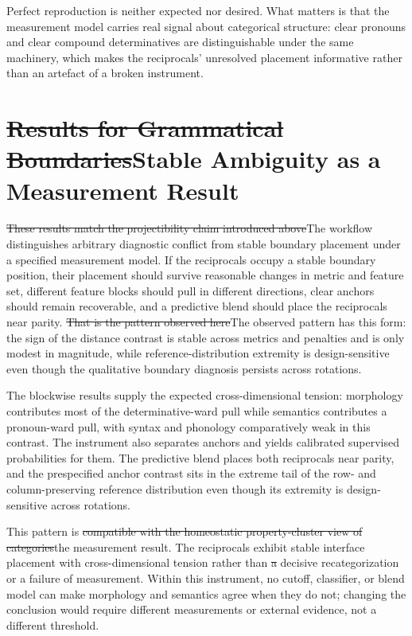 \documentclass[12pt]{article}
\providecommand{\DIFaddtex}[1]{{\protect\color{DIFgreen}#1}} %
\providecommand{\DIFdeltex}[1]{{\protect\color{red}\sout{#1}}}                      %
\providecommand{\DIFaddbegin}{} %
\providecommand{\DIFaddend}{} %
\providecommand{\DIFdelbegin}{} %
\providecommand{\DIFdelend}{} %
\providecommand{\DIFadd}[1]{\texorpdfstring{\DIFaddtex{#1}}{#1}} %
\providecommand{\DIFdel}[1]{\texorpdfstring{\DIFdeltex{#1}}{}} %
\newcommand{\DIFscaledelfig}{0.5}
\newlength{\DIFdelgraphicswidth} %
\newlength{\DIFdelgraphicsheight} %
\newcommand{\DIFaddincludegraphics}[2][]{{\color{DIFgreen}\fbox{\DIFOincludegraphics[#1]{#2}}}} %
\newcommand{\DIFdelincludegraphics}[2][]{%
\sbox{\DIFdelgraphicsbox}{\DIFOincludegraphics[#1]{#2}}%
\settoboxwidth{\DIFdelgraphicswidth}{\DIFdelgraphicsbox} %
\settoboxtotalheight{\DIFdelgraphicsheight}{\DIFdelgraphicsbox} %
\scalebox{\DIFscaledelfig}{%
\parbox[b]{\DIFdelgraphicswidth}{\usebox{\DIFdelgraphicsbox}\\[-\baselineskip] \rule{\DIFdelgraphicswidth}{0em}}\llap{\resizebox{\DIFdelgraphicswidth}{\DIFdelgraphicsheight}{%
\setlength{\unitlength}{\DIFdelgraphicswidth}%
\begin{picture}(1,1)%
\thicklines\linethickness{2pt} %
{\color[rgb]{1,0,0}\put(0,0){\framebox(1,1){}}}%
{\color[rgb]{1,0,0}\put(0,0){\line( 1,1){1}}}%
{\color[rgb]{1,0,0}\put(0,1){\line(1,-1){1}}}%
\end{picture}%
}\hspace*{3pt}}} %
} %
\DeclareRobustCommand{\DIFaddbegin}{\DIFOaddbegin \let\includegraphics\DIFaddincludegraphics} %
\DeclareRobustCommand{\DIFaddend}{\DIFOaddend \let\includegraphics\DIFOincludegraphics} %
\DeclareRobustCommand{\DIFdelbegin}{\DIFOdelbegin \let\includegraphics\DIFdelincludegraphics} %
\DeclareRobustCommand{\DIFdelend}{\DIFOaddend \let\includegraphics\DIFOincludegraphics} %
\begin{document}
Perfect reproduction is neither expected nor desired. What matters is that the measurement model carries real signal about categorical structure: clear pronouns and clear compound determinatives are distinguishable under the same machinery, which makes the reciprocals' unresolved placement informative rather than an artefact of a broken instrument.



\section{\DIFdelbegin \DIFdel{Results for Grammatical Boundaries}\DIFdelend \DIFaddbegin \DIFadd{Stable Ambiguity as a Measurement Result}\DIFaddend }

\DIFdelbegin \DIFdel{These results match the projectibility claim introduced above}\DIFdelend \DIFaddbegin \DIFadd{The workflow distinguishes arbitrary diagnostic conflict from stable boundary placement under a specified measurement model}\DIFaddend . If the reciprocals occupy a stable boundary position, their placement should survive reasonable changes in metric and feature set, different feature blocks should pull in different directions, clear anchors should remain recoverable, and a predictive blend should place the reciprocals near parity. \DIFdelbegin \DIFdel{That is the pattern observed here}\DIFdelend \DIFaddbegin \DIFadd{The observed pattern has this form}\DIFaddend : the sign of the distance contrast is stable across metrics and penalties and is only modest in magnitude, while reference-distribution extremity is design-sensitive even though the qualitative boundary diagnosis persists across rotations.

The blockwise results supply the expected cross-dimensional tension: morphology contributes most of the determinative-ward pull while semantics contributes a pronoun-ward pull, with syntax and phonology comparatively weak in this contrast. The instrument also separates anchors and yields calibrated supervised probabilities for them. The predictive blend places both reciprocals near parity, and the prespecified anchor contrast sits in the extreme tail of the row- and column-preserving reference distribution even though its extremity is design-sensitive across rotations.

This pattern is \DIFdelbegin \DIFdel{compatible with the homeostatic property-cluster view of categories}\DIFdelend \DIFaddbegin \DIFadd{the measurement result}\DIFaddend . The reciprocals exhibit stable interface placement with cross-dimensional tension rather than \DIFdelbegin \DIFdel{a }\DIFdelend decisive recategorization or a failure of measurement. Within this instrument, no cutoff, classifier, or blend model can make morphology and semantics agree when they do not; changing the conclusion would require different measurements or external evidence, not a different threshold.
\end{document}
